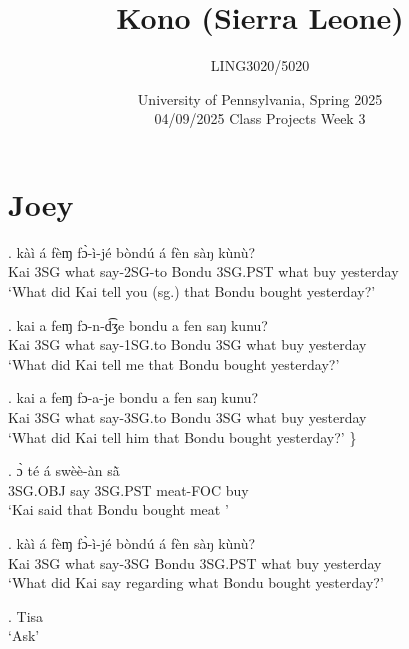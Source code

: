 \documentclass{assets/fieldnotes}
\title{Kono (Sierra Leone)}
\author{LING3020/5020}
\date{University of Pennsylvania, Spring 2025\\04/09/2025 Class Projects Week 3}
\begin{document}
\maketitle

\maketitle
\tableofcontents

\section{Joey}


\exg. kàì á fèɱ fɔ̀-ì-jé bòndú á fèn sàŋ kùnù?\\
Kai 3SG what say-2SG-to Bondu 3SG.PST what buy yesterday\\
`What did Kai tell you (sg.) that Bondu bought yesterday?'  

\exg. kai a feɱ fɔ-n-d͡ʒe bondu a fen saŋ kunu?\\
Kai 3SG what say-1SG.to Bondu 3SG what buy yesterday\\
`What did Kai tell me that Bondu bought yesterday?' 


\exg. kai a feɱ fɔ-a-je bondu a fen saŋ kunu?\\
Kai 3SG what say-3SG.to Bondu 3SG what buy yesterday\\
`What did Kai tell him that Bondu bought yesterday?' \}


\exg. ɔ̀ té á swèè-àn sã̀\\
3SG.OBJ say 3SG.PST meat-FOC buy\\
`Kai said that Bondu bought meat ' 


\exg. kàì á fèɱ fɔ̀-ì-jé bòndú á fèn sàŋ kùnù?\\ 
Kai 3SG what say-3SG Bondu 3SG.PST what buy yesterday\\
`What did Kai say regarding what Bondu bought yesterday?'  

\exg. Tisa\\
`Ask' \\ 
\end{document}
